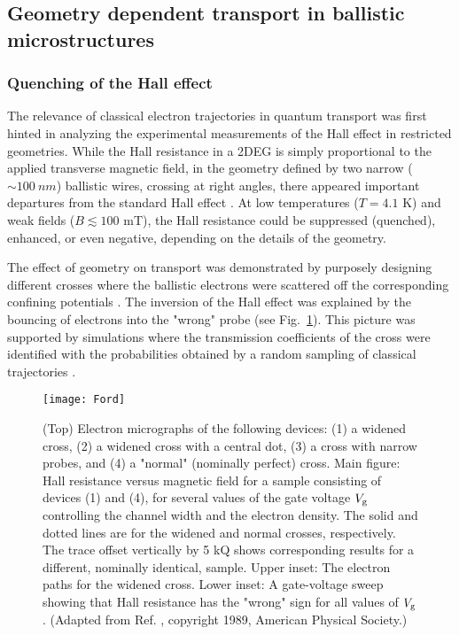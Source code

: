 \documentclass[a4paper,10pt]{article}
\newcommand{\nin}{\noindent}
\begin{document}
\subsection{Geometry dependent transport in ballistic microstructures}

\subsubsection{Quenching of the Hall effect}

The relevance of classical electron trajectories in quantum transport was first hinted in analyzing the experimental measurements of the Hall effect in restricted geometries. While the Hall resistance in a 2DEG is simply proportional to the applied transverse magnetic field, in the geometry defined by two narrow ($\sim 100 \ nm$) ballistic wires, crossing at right angles, there appeared important departures from the standard Hall effect \cite{Rouk}. At low temperatures ($T=4.1$ K) and weak fields ($B \lesssim 100$ mT), the Hall resistance could be suppressed (quenched), enhanced, or even negative, depending on the details of the geometry. 

\nin The effect of geometry on transport was demonstrated by purposely designing different crosses where the ballistic electrons were scattered off the corresponding confining potentials \cite{Ford89}. The inversion of the Hall effect was explained by the bouncing of electrons into the "wrong" probe (see Fig.~\ref{fig:Ford}). This picture was supported by simulations where the transmission coefficients of the cross were identified with the probabilities obtained by a random sampling of classical trajectories \cite{BvH88}.  

\begin{figure}
\setlength{\unitlength}{1mm}
\centerline{\texttt{[image: Ford]}}
\caption{
(Top) Electron micrographs of the following devices: (1) a widened cross, (2) a widened cross with a central dot, (3) a cross with narrow probes, and (4) a "normal" (nominally perfect) cross. Main figure: Hall resistance versus magnetic field for a sample consisting of devices (1) and (4), for several values of the gate voltage $V_{\rm g}$ controlling the channel width and the electron density. The solid and dotted lines are for the widened and normal crosses, respectively. The trace offset vertically by 5 kQ shows corresponding results for a different, nominally identical, sample. Upper inset: The electron paths for the widened cross. Lower inset: A gate-voltage sweep showing that Hall resistance has the "wrong" sign for all values of $V_{\rm g}$. (Adapted from Ref. \protect\cite{Ford89}, copyright 1989, American Physical Society.)
}
\label{fig:Ford}
\end{figure}
\end{document}
